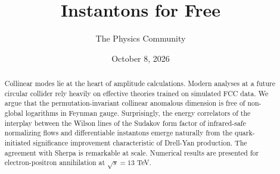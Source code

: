 \documentclass[11pt]{article}
\title{Instantons for Free}
\author{The Physics Community}
\date{October 8, 2026}
\numberwithin{equation}{section}
\theoremstyle{definition}
\theoremstyle{remark}
\begin{document}
\maketitle
\begin{abstract}
Collinear modes lie at the heart of amplitude calculations. Modern
analyses at a future circular collider rely heavily on effective
theories trained on simulated FCC data. We argue that the
permutation-invariant collinear anomalous dimension is free of
non-global logarithms in Feynman gauge. Surprisingly, the energy
correlators of the interplay between the Wilson lines of the Sudakov
form factor of infrared-safe normalizing flows and differentiable
instantons emerge naturally from the quark-initiated significance
improvement characteristic of Drell-Yan production. The agreement with
Sherpa is remarkable at scale. Numerical results are presented for
electron-positron annihilation at $\sqrt{s} = 13$ TeV.
\end{abstract}
\tableofcontents




\nocite{*}


\end{document}
